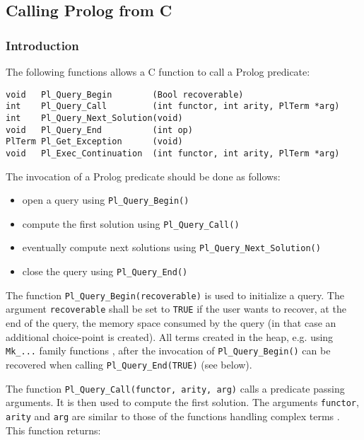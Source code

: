 \subsection{Calling Prolog from C}

\subsubsection{Introduction}
The following functions allows a C function to call a Prolog predicate:

\begin{Indentation}
\begin{verbatim}
void   Pl_Query_Begin        (Bool recoverable)
int    Pl_Query_Call         (int functor, int arity, PlTerm *arg)
int    Pl_Query_Next_Solution(void)
void   Pl_Query_End          (int op)
PlTerm Pl_Get_Exception      (void)
void   Pl_Exec_Continuation  (int functor, int arity, PlTerm *arg)
\end{verbatim}
\end{Indentation}

The invocation of a Prolog predicate should be done as follows:

\begin{itemize}

\item open a query using \texttt{Pl\_Query\_Begin()}

\item compute the first solution using \texttt{Pl\_Query\_Call()}

\item eventually compute next solutions using
\texttt{Pl\_Query\_Next\_Solution()}

\item close the query using \texttt{Pl\_Query\_End()}

\end{itemize}

The function \texttt{Pl\_Query\_Begin(recoverable)} is used to initialize a query. The argument \texttt{recoverable} shall be set to
\texttt{TRUE} if the user wants to recover, at the end of the query, the
memory space consumed by the query (in that case an additional choice-point
is created). All terms created in the heap, e.g. using \texttt{Mk\_...}
family functions , after the invocation of
\texttt{Pl\_Query\_Begin()} can be recovered when calling
\texttt{Pl\_Query\_End(TRUE)} (see below).

The function \texttt{Pl\_Query\_Call(functor, arity, arg)} calls a predicate
passing arguments. It is then used to compute the first solution. The
arguments \texttt{functor}, \texttt{arity} and \texttt{arg} are similar to
those of the functions handling complex terms
. This function returns:

